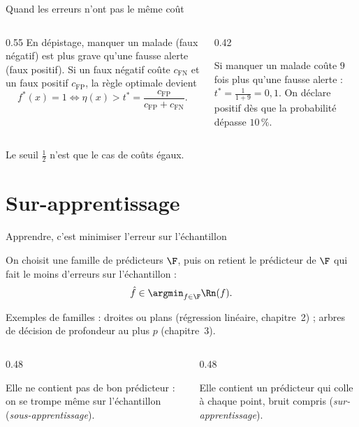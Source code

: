 \documentclass[aspectratio=169,11pt]{beamer}
\begin{document}
\begin{frame}{Quand les erreurs n'ont pas le même coût}
  \begin{columns}[T]
    \begin{column}{0.55\textwidth}
      En dépistage, manquer un malade (faux négatif) est plus grave qu'une fausse alerte (faux positif).
      \vskip2mm
      Si un faux négatif coûte $c_{\mathrm{FN}}$ et un faux positif $c_{\mathrm{FP}}$, la règle optimale devient
      \[
        f^*(x)=1\iff\eta(x)>t^*=\frac{c_{\mathrm{FP}}}{c_{\mathrm{FP}}+c_{\mathrm{FN}}} .
      \]
    \end{column}
    \begin{column}{0.42\textwidth}
      \begin{exemple}
        Si manquer un malade coûte $9$ fois plus qu'une fausse alerte : $t^*=\frac{1}{1+9}=0{,}1$.
        On déclare positif dès que la probabilité dépasse $10\,\%$.
      \end{exemple}
    \end{column}
  \end{columns}
  \vskip2mm
  {\small\color{cnfGris}Le seuil $\frac12$ n'est que le cas de coûts égaux.}
\end{frame}

\section{Sur-apprentissage}

\begin{frame}{Apprendre, c'est minimiser l'erreur sur l'échantillon}
  \begin{definition}
    On choisit une famille de prédicteurs $\F$, puis on retient le prédicteur de $\F$ qui fait le moins d'erreurs sur l'échantillon :
    \[
      \hat f\in\argmin_{f\in\F}\Rn(f).
    \]
  \end{definition}
  {\small Exemples de familles : droites ou plans (régression linéaire, chapitre~2) ; arbres de décision de profondeur au plus $p$ (chapitre~3).}
  \vskip2mm
  \begin{columns}[T]
    \begin{column}{0.48\textwidth}
      \begin{remarque}
        Elle ne contient pas de bon prédicteur : on se trompe même sur l'échantillon (\emph{sous-apprentissage}).
      \end{remarque}
    \end{column}
    \begin{column}{0.48\textwidth}
      \begin{remarque}
        Elle contient un prédicteur qui colle à chaque point, bruit compris (\emph{sur-apprentissage}).
      \end{remarque}
    \end{column}
  \end{columns}
\end{frame}
\end{document}
